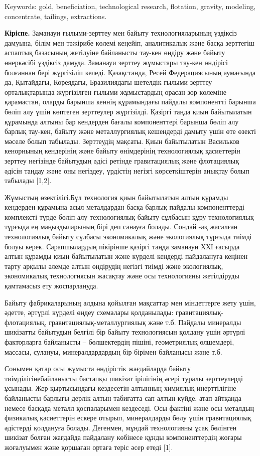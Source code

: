 Keywords: gold, beneficiation, technological research, flotation,
gravity, modeling, concentrate, tailings, extractions.
\begin{multicols}{2}

{\bfseries Кіріспе.} Заманауи ғылыми-зерттеу мен байыту технологияларының
үздіксіз дамуына, білім мен тәжірибе көлемі кеңейіп, аналитикалық және
басқа зерттегіш аспаптық базасының жетілуіне байланысты тау-кен өндіру
және байыту өнеркәсібі үздіксіз дамуда. Заманауи зерттеу жұмыстары
тау-кен өндірісі болғаннан бері жүргізіліп келеді. Қазақстанда, Ресей
Федерациясының аумағында да, Қытайдағы, Кореядағы, Бразилиядағы шетелдік
ғылыми зерттеу орталықтарында жүргізілген ғылыми жұмыстардың орасан зор
көлеміне қарамастан, оларды барынша кеннің құрамындағы пайдалы
компонентті барынша бөліп алу үшін көптеген зерттеулер жүргізілді.
Қазіргі таңда қиын байытылатын құрамында алтыны бар кендерден бағалы
компоненттері барынша бөліп алу барлық тау-кен, байыту және
металлургиялық кешендерді дамыту үшін өте өзекті мәселе болып табылады.
Зерттеудің мақсаты. Қиын байытылатын Васильков кенорнының кендерінің
және байыту өнімдерінің технологиялық қасиеттерін зерттеу негізінде
байытудың әдісі ретінде гравитациялық және флотациялық әдісін таңдау
және оны негіздеу, үрдістің негізгі көрсеткіштерін анықтау болып
табылады {[}1,2{]}.

Жұмыстың өзектілігі.Бұл технология қиын байытылатын алтын құрамды
кендерден құрамына асыл металдардан басқа барлық пайдалы компоненттерді
комплексті түрде бөліп алу технологиялық байыту сұлбасын құру
технологиялық тұрғыда ең маңыздыларының бірі деп санауға болады. Сондай
-ақ жасалған технологиялық байыту сұлбасы экономикалық және экологиялық
тұрғыда тиімді болуы керек. Сарапшылардың пікірінше қазіргі таңда
заманауи ХХІ ғасырда алтын құрамды қиын байытылатын және күрделі
кендерді пайдалануға кеңінен тарту арқылы әлемде алтын өндірудің негізгі
тиімді және экологиялық, экономикалық технологиясын жасақтау және осы
технологияны жетілдіруды қамтамасыз ету жоспарлануда.

Байыту фабрикаларының алдына қойылған мақсаттар мен міндеттерге жету
үшін, әдетте, әртүрлі күрделі өңдеу схемалары қолданылады:
гравитациялық-флотациялық, гравитациялық-металлургиялық және т.б.
Пайдалы минералды шикізатты байытудың белгілі бір байыту технологиясын
қолдану үшін әртүрлі факторларға байланысты -- бөлшектердің пішіні,
геометриялық өлшемдері, массасы, сулануы, минералдардардың бір бірімен
байланысы және т.б.

Сонымен қатар осы жұмыста өндірістік жағдайларда байыту
тиімділігінебайланысты бастапқы шикізат ірілігінің әсері туралы
зерттеулерді ұсынады. Жер қыртысындағы кездесетін алтынның химиялық
инерттілігіне байланысты барлығы дерлік алтын табиғатта сап алтын күйде,
атап айтқанда немесе басқада металл қоспаларымен кездеседі. Осы фактіні
және осы металдың физикалық қасиеттерін ескере отырып, минералдарды бөлу
үшін гравитациялық әдістерді қолдануға болады. Дегенмен, мұндай
технологияны ұсақ бөлінген шикізат болған жағдайда пайдалану көбінесе
құнды компоненттердің жоғары жоғалуымен және қоршаған ортаға теріс әсер
етеді {[}1{]}.


\end{multicols}
